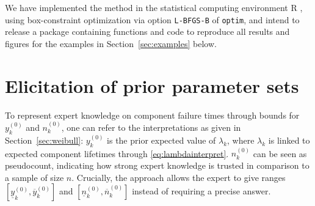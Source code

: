 \documentclass[Journal,SectionNumbers,InsideFigs]{ascelike}
\newcommand{\mbf}[1]{\mathbf{#1}}
\newcommand{\uz}{^{(0)}} %
\newcommand{\un}{^{(n)}} %
\newcommand{\ul}[1]{\underline{#1}}
\newcommand{\ol}[1]{\overline{#1}}
\def\Tsys{T_\text{sys}}
\def\ykz{y\uz_k}
\def\ykn{y\un_k}
\def\ykzl{\ul{y}\uz_k}
\def\ykzu{\ol{y}\uz_k}
\def\nkz{n\uz_k}
\def\nkn{n\un_k}
\def\nkzl{\ul{n}\uz_k}
\def\nkzu{\ol{n}\uz_k}
\def\tnow{t_\text{now}}
\begin{document}
\iffalse %
\begin{linenomath*}
\begin{align}
\lefteqn{P(\Tsys > t\mid\{\nkz,\ykz, \mbf{t}^k_{e_k;n_k}\}_{k=1}^K)} \\
 &= \sum_{l_1=0}^{n_1-e_1} \cdots \sum_{l_K=0}^{n_K-e_K} \Phi(l_1,\ldots,l_K) \prod_{k=1}^K
    P(C^k_t = l_k\mid\nkz,\ykz, \mbf{t}^k_{e_k;n_k}) \\
 &= \sum_{l_1=0}^{n_1-e_1} \cdots \sum_{l_K=0}^{n_K-e_K} \Phi(l_1,\ldots,l_K) \prod_{k=1}^K
    \sum_{j=0}^{n_k-e_k-l_k} (-1)^j \frac{(n_k - e_k)!}{l_k! j! (n_k - e_k - l_k - j)!} \times \\ & \hspace*{45ex}
    \left(\frac{\nkn\ykn}{\nkn\ykn + (l_k + j) (t^\kappa - (\tnow)^\kappa)}\right)^{\nkn + 1} \\
 &= \sum_{l_1=0}^{n_1-e_1} \cdots \sum_{l_K=0}^{n_K-e_K} \Phi(l_1,\ldots,l_K) \prod_{k=1}^K \label{eq:30}
    \sum_{j=0}^{n_k-e_k-l_k} (-1)^j \frac{(n_k - e_k)!}{l_k! j! (n_k - e_k - l_k - j)!} \times \\ & \hspace*{17ex}
    \left(\frac{\nkz\ykz + \sum_{i=1}^{e_k} (t_i^k)^\kappa + (n_k-e_k) (\tnow)^\kappa }%
               {\nkz\ykz + \sum_{i=1}^{e_k} (t_i^k)^\kappa + (n_k-e_k-l_k-j) (\tnow)^\kappa + (l_k + j) t^\kappa }\right)^{%
    \nkz + e_k + 1} 
\end{align}
\end{linenomath*}
\fi %

We have implemented the method in the statistical computing environment \textsf{R} \cite{R},
using box-constraint optimization via option \texttt{L-BFGS-B} of \texttt{optim},
and intend to release a package containing functions and code to reproduce all results and figures
for the examples in Section~\ref{sec:examples} below.


\section{Elicitation of prior parameter sets}
\label{sec:elicitation}

To represent expert knowledge on component failure times
through bounds for $\ykz$ and $\nkz$,
one can refer to the interpretations as given in Section~\ref{sec:weibull}:
$\ykz$ is the prior expected value of $\lambda_k$,
where $\lambda_k$ is linked to expected component lifetimes through \eqref{eq:lambdainterpret}.
$\nkz$ can be seen as pseudocount, indicating how strong expert knowledge is trusted
in comparison to a sample of size $n$.
Crucially, the approach allows the expert to give ranges $[\ykzl, \ykzu]$ and $[\nkzl, \nkzu]$
instead of requiring a precise answer.
\end{document}
